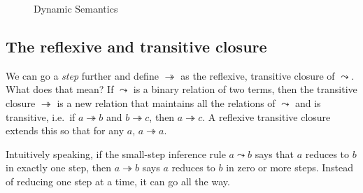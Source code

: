 \begin{figure}
  \caption{Dynamic Semantics}\label{fig:dynamicsemantics}
\end{figure}

\subsection{The reflexive and transitive closure}

We can go a \textit{step} further and define $\twoheadrightarrow$ as the reflexive,
transitive closure of $\leadsto$. What does that mean? If $\leadsto$ is a binary
relation of two terms, then the transitive closure
$\twoheadrightarrow$ is a new relation that maintains all the relations of
$\leadsto$ and is transitive, i.e.\ if $a \twoheadrightarrow b$ and
$b \twoheadrightarrow c$, then $a \twoheadrightarrow c$.  A reflexive transitive closure extends this so
that for any $a$, $a \twoheadrightarrow a$.

Intuitively speaking, if the small-step inference rule $a \leadsto b$ says
that $a$ reduces to $b$ in exactly one step, then
$a \twoheadrightarrow b$ says $a$ reduces to $b$ in zero or more steps. Instead of
reducing one step at a time, it can go all the way.

